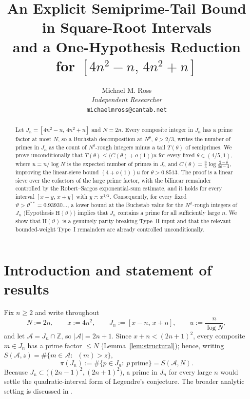 \documentclass[11pt]{article}
\title{An Explicit Semiprime-Tail Bound in Square-Root Intervals\\
and a One-Hypothesis Reduction for $[4n^2-n,\,4n^2+n]$}
\author{Michael M. Ross\\
\textit{Independent Researcher}\\
\small \texttt{michaelmross@cantab.net}}
\theoremstyle{remark}
\DeclareMathOperator{\pmin}{P^{-}}
\newcommand{\N}{N}
\newcommand{\J}{J_n}
\newcommand{\A}{\mathcal{A}}
\begin{document}
\maketitle
{}

\begin{abstract}
Let $\J=[4n^2-n,\,4n^2+n]$ and $N=2n$. Every composite integer in $\J$ has a prime
factor at most $N$, so a Buchstab decomposition at $N^{\theta}$, $\theta>2/3$, writes
the number of primes in $\J$ as the count of $N^{\theta}$-rough integers minus a tail
$T(\theta)$ of semiprimes. We prove unconditionally that
$T(\theta)\le\bigl(C(\theta)+o(1)\bigr)u$ for every fixed $\theta\in(4/5,1)$, where
$u=n/\log N$ is the expected number of primes in $\J$ and
$C(\theta)=\frac83\log\frac{2-\theta}{5\theta-4}$, improving the linear-sieve bound
$(4+o(1))u$ for $\theta>0.8513$. The proof is a linear sieve over the cofactors of the
large prime factor, with the bilinear remainder controlled by the Robert--Sargos
exponential-sum estimate, and it holds for every interval $[x-y,\,x+y]$ with
$y\asymp x^{1/2}$. Consequently, for every fixed
$\vartheta>\vartheta^{**}=0.93930\ldots$, a lower bound at the Buchstab value for the
$N^{\vartheta}$-rough integers of $\J$ (Hypothesis $\mathrm{H}(\vartheta)$) implies
that $\J$ contains a prime for all sufficiently large $n$. We show that $\mathrm{H}(\vartheta)$ is a genuinely parity-breaking Type~II input and that the relevant bounded-weight Type~I remainders are already controlled unconditionally.
\end{abstract}

\section{Introduction and statement of results}\label{sec:intro}

Fix $n\ge 2$ and write throughout
\[
\N:=2n,\qquad x:=4n^2,\qquad \J:=[x-n,\,x+n],\qquad u:=\frac{n}{\log \N},
\]
and let $\A=\J\cap\mathbb{Z}$, so $|\A|=2n+1$. Since $x+n<(2n+1)^2$, every composite
$m\in\J$ has a prime factor $\le \N$ (Lemma~\ref{lem:structural}); hence, writing
$S(\A,z)=\#\{m\in\A:\pmin(m)>z\}$,
\begin{equation}\label{eq:pure-sieve}
\pi(\J):=\#\{p\in\J:\ p\ \text{prime}\}=S(\A,\N).
\end{equation}
Because $\J\subset\bigl((2n-1)^2,(2n+1)^2\bigr)$, a prime in $\J$ for every large $n$
would settle the quadratic-interval form of Legendre's conjecture. The broader
analytic setting is discussed in \cite{RossObstruction}.
\end{document}
